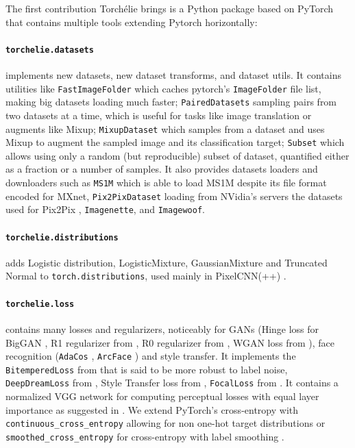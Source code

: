 The first contribution Torchélie brings is a Python package based on PyTorch that contains multiple tools extending Pytorch horizontally:

\paragraph{\texttt{torchelie.datasets}} implements new datasets, new dataset transforms, and dataset utils. It contains utilities like \texttt{FastImageFolder} which caches pytorch's \texttt{ImageFolder} file list, making big datasets loading much faster; \texttt{PairedDatasets} sampling pairs from two datasets at a time, which is useful for tasks like image translation or augments like Mixup; \texttt{MixupDataset} which samples from a dataset and uses Mixup to augment the sampled image and its classification target; \texttt{Subset} which allows using only a random (but reproducible) subset of dataset, quantified either as a fraction or a number of samples. It also provides datasets loaders and downloaders such as \texttt{MS1M} which is able to load MS1M despite its file format encoded for MXnet, \texttt{Pix2PixDataset} loading from NVidia's servers the datasets used for Pix2Pix \cite{pix2pix}, \texttt{Imagenette}, and \texttt{Imagewoof}.

\paragraph{\texttt{torchelie.distributions}} adds Logistic distribution, LogisticMixture, GaussianMixture and Truncated Normal to \texttt{torch.distributions}, used mainly in PixelCNN(++) \cite{pixelcnn,pixelcnn++}.

\paragraph{\texttt{torchelie.loss}} contains many losses and regularizers, noticeably for \acp{GAN} (Hinge loss for BigGAN \cite{biggan}, R1 regularizer from \cite{R1}, R0 regularizer from \cite{r0}, WGAN loss from \cite{wgangp}), face recognition (\texttt{AdaCos} \cite{adacos}, \texttt{ArcFace} \cite{arcface}) and style transfer. It implements the \texttt{BitemperedLoss} from \citet{Bitempered} that is said to be more robust to label noise, \texttt{DeepDreamLoss} from \citet{deepdream}, Style Transfer loss from \citet{styletransfer}, \texttt{FocalLoss} from \citet{focalloss}. It contains a normalized VGG network for computing perceptual losses \cite{perceptualloss} with equal layer importance as suggested in \cite{styletransfer}. We extend PyTorch's cross-entropy with \texttt{continuous\_cross\_entropy} allowing for non one-hot target distributions or \texttt{smoothed\_cross\_entropy} for cross-entropy with label smoothing \cite{inceptionv2}.

